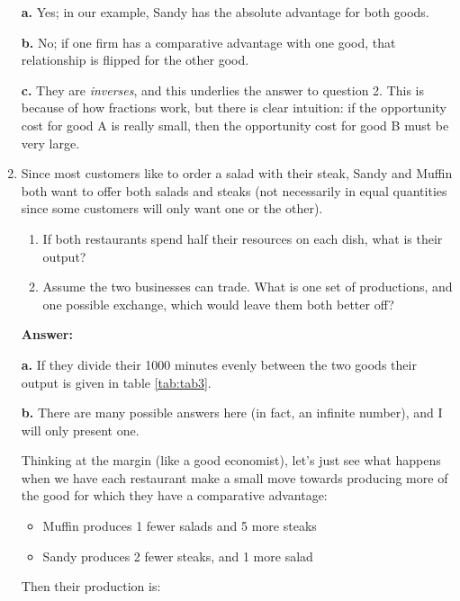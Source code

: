 \documentclass[12pt]{article}
\begin{document}
\begin{enumerate}
\textbf{a.} Yes; in our example, Sandy has the absolute advantage for both goods.

\medskip

\textbf{b.} No; if one firm has a comparative advantage with one good, that relationship is flipped for the other good.

\medskip

\textbf{c.} They are \textit{inverses}, and this underlies the answer to question 2. This is because of how fractions work, but there is clear intuition: if the opportunity cost for good A is really small, then the opportunity cost for good B must be very large.

\medskip
\medskip
\medskip

\item Since most customers like to order a salad with their steak, Sandy and Muffin both want to offer both salads and steaks (not necessarily in equal quantities since some customers will only want one or the other).

\begin{enumerate}
    \item If both restaurants spend half their resources on each dish, what is their output?
    \item Assume the two businesses can trade. What is one set of productions, and one possible exchange, which would leave them both better off?
\end{enumerate}

\textbf{Answer:}

\textbf{a.} If they divide their 1000 minutes evenly between the two goods their output is given in table \ref{tab:tab3}.



\textbf{b.} There are many possible answers here (in fact, an infinite number), and I will only present one.

\medskip

Thinking at the margin (like a good economist), let's just see what happens when we have each restaurant make a small move towards producing more of the good for which they have a comparative advantage:
    \begin{itemize}
        \item Muffin produces 1 fewer salads and 5 more steaks
        \item Sandy produces 2 fewer steaks, and 1 more salad
    \end{itemize}
    
Then their production is:


\end{enumerate}
\end{document}

